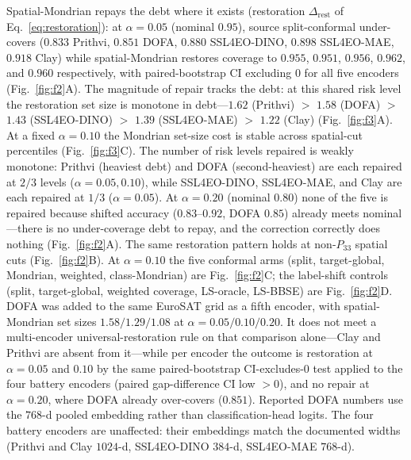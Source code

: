 \documentclass[preprint,11pt,authoryear]{elsarticle}
\begin{document}

Spatial-Mondrian repays the debt where it exists (restoration $\Delta_{\mathrm{rest}}$ of
Eq.~\eqref{eq:restoration}): at $\alpha=0.05$ (nominal $0.95$), source
split-conformal under-covers ($0.833$ Prithvi, $0.851$ DOFA, $0.880$ SSL4EO-DINO, $0.898$ SSL4EO-MAE, $0.918$ Clay)
while spatial-Mondrian restores coverage to $0.955$, $0.951$, $0.956$, $0.962$, and $0.960$ respectively,
with paired-bootstrap CI excluding $0$ for all five encoders (Fig.~\ref{fig:f2}A). The magnitude of repair tracks the debt:
at this shared risk level the restoration set size is monotone in debt---$1.62$ (Prithvi) $>$ $1.58$ (DOFA) $>$ $1.43$
(SSL4EO-DINO) $>$ $1.39$ (SSL4EO-MAE) $>$ $1.22$ (Clay) (Fig.~\ref{fig:f3}A). At a fixed $\alpha{=}0.10$ the Mondrian set-size cost is stable across spatial-cut percentiles (Fig.~\ref{fig:f3}C).
The number of risk levels repaired is weakly monotone: Prithvi (heaviest debt) and DOFA (second-heaviest) are each repaired at $2/3$
levels ($\alpha=0.05,0.10$), while SSL4EO-DINO, SSL4EO-MAE, and Clay are each repaired at $1/3$ ($\alpha=0.05$). At
$\alpha=0.20$ (nominal $0.80$) none of the five is repaired because shifted accuracy ($0.83$--$0.92$, DOFA $0.85$) already meets
nominal---there is no under-coverage debt to repay, and the correction correctly does nothing
(Fig.~\ref{fig:f2}A). The same restoration pattern holds at non-$P_{33}$ spatial cuts (Fig.~\ref{fig:f2}B). At $\alpha{=}0.10$ the five conformal arms (split, target-global, Mondrian, weighted, class-Mondrian) are Fig.~\ref{fig:f2}C; the label-shift controls (split, target-global, weighted coverage, LS-oracle, LS-BBSE) are Fig.~\ref{fig:f2}D. DOFA was added to the same EuroSAT grid as a fifth encoder, with spatial-Mondrian set sizes
$1.58/1.29/1.08$ at $\alpha=0.05/0.10/0.20$. It does not meet a multi-encoder universal-restoration
rule on that comparison alone---Clay and Prithvi are absent from it---while per encoder the outcome is
restoration at $\alpha=0.05$ and $0.10$ by the same paired-bootstrap CI-excludes-$0$ test applied to
the four battery encoders (paired gap-difference CI low $>0$), and no repair at $\alpha=0.20$, where DOFA already
over-covers ($0.851$). Reported DOFA numbers use the $768$-d pooled embedding rather than
classification-head logits. The four battery encoders are
unaffected: their embeddings match the documented widths (Prithvi and Clay
$1024$-d, SSL4EO-DINO $384$-d, SSL4EO-MAE $768$-d).
\end{document}
